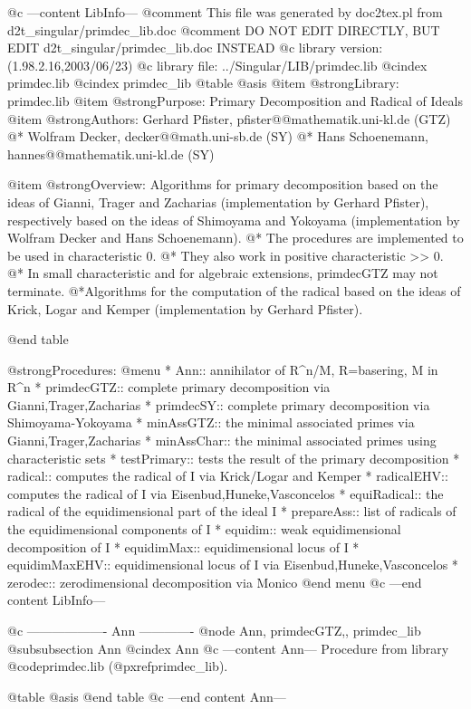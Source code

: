 @c ---content LibInfo---
@comment This file was generated by doc2tex.pl from d2t_singular/primdec_lib.doc
@comment DO NOT EDIT DIRECTLY, BUT EDIT d2t_singular/primdec_lib.doc INSTEAD
@c library version: (1.98.2.16,2003/06/23)
@c library file: ../Singular/LIB/primdec.lib
@cindex primdec.lib
@cindex primdec_lib
@table @asis
@item @strong{Library:}
primdec.lib
@item @strong{Purpose:}
   Primary Decomposition and Radical of Ideals
@item @strong{Authors:}
Gerhard Pfister, pfister@@mathematik.uni-kl.de (GTZ)
@* Wolfram Decker, decker@@math.uni-sb.de (SY)
@* Hans Schoenemann, hannes@@mathematik.uni-kl.de (SY)

@item @strong{Overview:}
Algorithms for primary decomposition based on the ideas of
Gianni, Trager and Zacharias (implementation by Gerhard Pfister),
respectively based on the ideas of Shimoyama and Yokoyama (implementation
by Wolfram Decker and Hans Schoenemann).
@* The procedures are implemented to be used in characteristic 0.
@* They also work in positive characteristic >> 0.
@* In small characteristic and for algebraic extensions, primdecGTZ
may not terminate.
@*Algorithms for the computation of the radical based on the ideas of
Krick, Logar and Kemper (implementation by Gerhard Pfister).

@end table

@strong{Procedures:}
@menu
* Ann:: annihilator of R^n/M, R=basering, M in R^n
* primdecGTZ:: complete primary decomposition via Gianni,Trager,Zacharias
* primdecSY:: complete primary decomposition via Shimoyama-Yokoyama
* minAssGTZ:: the minimal associated primes via Gianni,Trager,Zacharias
* minAssChar:: the minimal associated primes using characteristic sets
* testPrimary:: tests the result of the primary decomposition
* radical:: computes the radical of I via Krick/Logar and Kemper
* radicalEHV:: computes the radical of I via Eisenbud,Huneke,Vasconcelos
* equiRadical:: the radical of the equidimensional part of the ideal I
* prepareAss:: list of radicals of the equidimensional components of I
* equidim:: weak equidimensional decomposition of I
* equidimMax:: equidimensional locus of I
* equidimMaxEHV:: equidimensional locus of I via Eisenbud,Huneke,Vasconcelos
* zerodec:: zerodimensional decomposition via Monico
@end menu
@c ---end content LibInfo---

@c ------------------- Ann -------------
@node Ann, primdecGTZ,, primdec_lib
@subsubsection Ann
@cindex Ann
@c ---content Ann---
Procedure from library @code{primdec.lib} (@pxref{primdec_lib}).

@table @asis
@end table
@c ---end content Ann---

